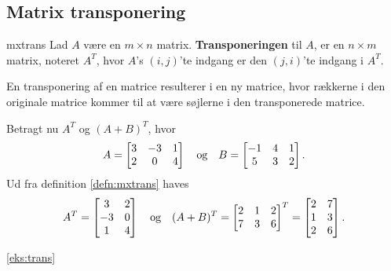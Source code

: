 \subsection{Matrix transponering}
\begin{defn}{}{mxtrans}
Lad $A$ være en $m \times n$ matrix. \textbf{Transponeringen} til $A$, er en $n \times m$ matrix, noteret $A^T$, hvor $A$'s $(i,j)$'te indgang er den $(j,i)$'te indgang i $A^T$.
\end{defn}
En transponering af en matrice resulterer i en ny matrice, hvor rækkerne i den originale matrice kommer til at være søjlerne i den transponerede matrice.

\begin{eks}\label{eks:trans}
Betragt nu $A^T$ og $(A+B)^T$, hvor 
\begin{align*}
A= 
\begin{bmatrix}
3	&	-3	&	1\\
2	&	0	&	4
\end{bmatrix}
\text{\phantom{---}og\phantom{---}}
B= 
\begin{bmatrix}
-1	&	4	&	1\\
5	&	3	&	2
\end{bmatrix}.
\end{align*}
Ud fra definition \ref{defn:mxtrans} haves
\begin{align*}
A^T =
\begin{bmatrix}
3	&	2\\
-3	&	0\\
1	&	4
\end{bmatrix}
\text{\phantom{---}og\phantom{---}}
(A+B)^T=
\begin{bmatrix}
2	&	1	&	2\\
7	&	3	&	6
\end{bmatrix}^T
=
\begin{bmatrix}
2	&	7\\
1	&	3\\
2	&	6
\end{bmatrix}.
\end{align*}
\end{eks}

\ref{eks:trans}
